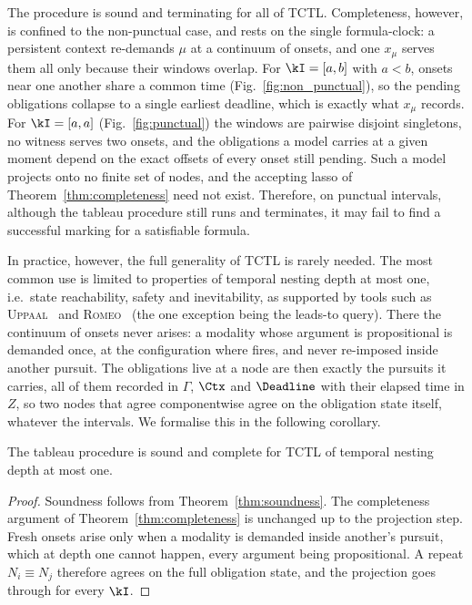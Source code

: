 The procedure is sound and terminating for all of TCTL. Completeness, however, is confined to
the non-punctual case, and rests on the single formula-clock: a persistent context re-demands
$\mu$ at a continuum of onsets, and one $x_\mu$ serves them all only because their windows
overlap. For $\kI=[a,b]$ with $a<b$, onsets near one another share a common time
(Fig.~\ref{fig:non_punctual}), so the pending obligations collapse to a single earliest deadline,
which is exactly what $x_\mu$ records. For $\kI=[a,a]$ (Fig.~\ref{fig:punctual}) the windows are pairwise disjoint
singletons, no witness serves two onsets, and the obligations a model carries at a given moment
depend on the exact offsets of every onset still pending. Such a model projects onto no finite
set of nodes, and the accepting lasso of Theorem~\ref{thm:completeness} need not exist. Therefore, on punctual intervals, although the tableau procedure still runs and terminates, it may fail to find a successful marking for a satisfiable formula. 

In practice, however, the full generality of TCTL is rarely needed. The most common use is
limited to properties of temporal nesting depth at most one, i.e.\ state reachability, safety and
inevitability, as supported by tools such as
\textsc{Uppaal}~\cite{BehrmannLarsenYi2004Uppaal} and \textsc{Romeo}~\cite{lime-TACAS-09} (the one exception being the leads-to query). There the continuum of onsets never arises: a modality whose argument is propositional is demanded once, at the configuration where  fires,
and never re-imposed inside another pursuit. The obligations live at a node are then exactly the
pursuits it carries, all of them recorded in $\Gamma$, $\Ctx$ and $\Deadline$ with their elapsed time in
$Z$, so two nodes that agree componentwise agree on the obligation state itself, whatever the
intervals. We formalise this in the following corollary.

\begin{corollary}\label{cor:depthone}
The tableau procedure is sound and complete for TCTL of temporal nesting depth at most one.
\end{corollary}
\begin{proof}
Soundness follows from Theorem~\ref{thm:soundness}. The completeness argument of Theorem~\ref{thm:completeness} is unchanged up to the projection
step. Fresh onsets arise only when a modality is
demanded inside another's pursuit, which at depth one cannot happen, every argument being
propositional. A repeat $N_i\equiv N_j$ therefore agrees on the full obligation state, and the
projection goes through for every $\kI$.
\end{proof}


